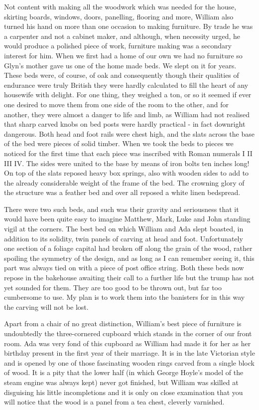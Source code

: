 Not content with making all the woodwork which was needed for the house, skirting boards, windows, doors, panelling, flooring and more, William also turned his hand on more than one occasion to making furniture. By trade he was a carpenter and not a cabinet maker, and although, when necessity urged, he would produce a polished piece of work, furniture making was a secondary interest for him. When we first had a home of our own we had no furniture so Glyn's mother gave us one of the home made beds. We slept on it for years. These beds were, of course, of oak and consequently though their qualities of endurance were truly British they were hardly calculated to fill the heart of any housewife with delight. For one thing, they weighed a ton, or so it seemed if ever one desired to move them from one side of the room to the other, and for another, they were almost a danger to life and limb, as William had not realised that sharp carved knobs on bed posts were hardly practical - in fact downright dangerous. Both head and foot rails were chest high, and the slats across the base of the bed were pieces of solid timber. When we took the beds to pieces we noticed for the first time that each piece was inscribed with Roman numerals I II III IV. The sides were united to the base by means of iron bolts ten inches long! On top of the slats reposed heavy box springs, also with wooden sides to add to the already considerable weight of the frame of the bed. The crowning glory of the structure was a feather bed and over all reposed a white linen bedspread.

There were two such beds, and such was their gravity and seriousness that it would have been quite easy to imagine Matthew, Mark, Luke and John standing vigil at the corners. The best bed on which William and Ada slept boasted, in addition to its solidity, twin panels of carving at head and foot. Unfortunately one section of a foliage capital had broken off along the grain of the wood, rather spoiling the symmetry of the design, and as long as I can remember seeing it, this part was always tied on with a piece of post office string. Both these beds now repose in the bakehouse awaiting their call to a further life but the trump has not yet sounded for them. They are too good to be thrown out, but far too cumbersome to use. My plan is to work them into the banisters for in this way the carving will not be lost.

Apart from a chair of no great distinction, William's best piece of furniture is undoubtedly the three-cornered cupboard which stands in the corner of our front room. Ada was very fond of this cupboard as William had made it for her as her birthday present in the first year of their marriage. It is in the late Victorian style and is opened by one of those fascinating wooden rings carved from a single block of wood. It is a pity that the lower half (in which George Hoyle's model of the steam engine was always kept) never got finished, but William was skilled at disguising his little incompletions and it is only on close examination that you will notice that the wood is a panel from a tea chest, cleverly varnished.

